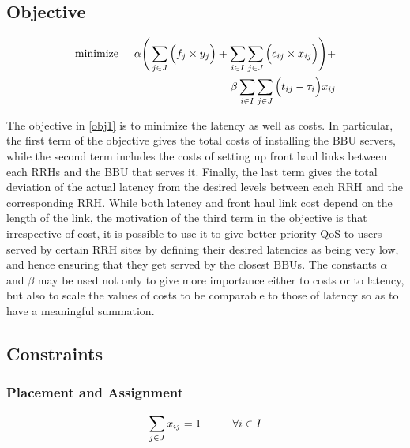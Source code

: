\documentclass[conference]{IEEEtran}
\def\Min{{\rm minimize }}
\begin{document}
\subsection{Objective}

\begin{align}
\label{obj1}
\begin{split}
\Min \hspace{5 mm} \alpha \Bigg( \sum_{j \in J} \Big( f_j \times y_j \Big) + \sum_{i \in I} \sum_{j \in J} \Big( c_{ij} \times x_{ij} \Big) \Bigg) + \\ \beta \sum_{i \in I} \sum_{j \in J} \Big(t_{ij} - \tau_i \Big) x_{ij}
\end{split}
\end{align}


The objective in \eqref{obj1} is to minimize the latency as well as costs. In particular, the first term of the objective gives the total costs of installing the \ac{BBU} servers, while the second term includes the costs of setting up front haul links between each \acp{RRH} and the \ac{BBU} that serves it. Finally, the last term gives the total deviation of the actual latency from the desired levels between each \ac{RRH} and the corresponding \ac{RRH}. While both latency and front haul link cost depend on the length of the link, the motivation of the third term in the objective is that irrespective of cost, it is possible to use it to give better priority QoS to users served by certain \ac{RRH} sites by defining their desired latencies as being very low, and hence ensuring that they get served by the closest \acp{BBU}. The constants $\alpha$ and $\beta$ may be used not only to give more importance either to costs or to latency, but also to scale the values of costs to be comparable to those of latency so as to have a meaningful summation.


\subsection{Constraints}

\subsubsection{Placement and Assignment}

\begin{equation}
\sum \limits_{j \in J} x_{ij} = 1 \hspace{10 mm}\forall i \in I
\label{c2}
\end{equation}
\end{document}
